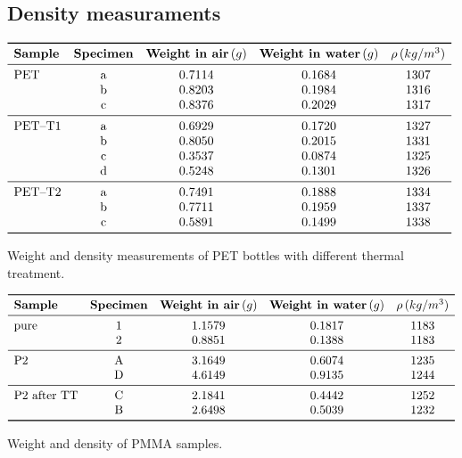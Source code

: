\documentclass[a4paper, 11pt]{article}
\begin{document}
\newpage

\begin{appendices}

\section{Density measuraments}

\begin{table}[htp]
\centering
$
\begin{array}{lcccc}
\toprule
\textbf{Sample} & \textbf{Specimen} & \textbf{Weight in air}\,(g) & \textbf{Weight in water}\,(g) & \mathbf{\rho}\,(kg/m^{3})\\
\midrule
\text{PET} & \text{a} & 0.7114 & 0.1684 & 1307\\
& \text{b} & 0.8203 & 0.1984 & 1316\\
& \text{c} & 0.8376 & 0.2029 & 1317\\
\midrule
\text{PET–T1} & \text{a} & 0.6929 & 0.1720 &  1327\\
& \text{b} & 0.8050 & 0.2015 & 1331\\
& \text{c} & 0.3537 & 0.0874 & 1325\\
& \text{d} & 0.5248 & 0.1301 & 1326\\
\midrule
\text{PET–T2} & \text{a} & 0.7491 & 0.1888 & 1334\\
& \text{b} & 0.7711 & 0.1959 & 1337\\
& \text{c} & 0.5891 & 0.1499 & 1338\\
\bottomrule
\end{array}
$
\caption{Weight and density measurements of PET bottles with different thermal treatment.}
\label{tab:admt}
\end{table}

\begin{table}[htp]
\centering
$
\begin{array}{lcccc}
\toprule
\textbf{Sample} & \textbf{Specimen} & \textbf{Weight in air}\,(g) & \textbf{Weight in water}\,(g) &  \mathbf{\rho}\,(kg/m^{3})\\
\midrule
\text{pure} & 1 & 1.1579 & 0.1817 & 1183\\
& 2 & 0.8851 & 0.1388 & 1183\\
\midrule
\text{P2} & \text{A} & 3.1649 & 0.6074 & 1235\\
& \text{D} & 4.6149 & 0.9135 & 1244\\
\midrule
\text{P2 after TT} & \text{C} & 2.1841 & 0.4442 & 1252\\
& \text{B} & 2.6498 & 0.5039 & 1232\\
\bottomrule
\end{array}
$
\caption{Weight and density of PMMA samples.}
\label{tab:apmma}
\end{table}


\end{appendices}
\end{document}
